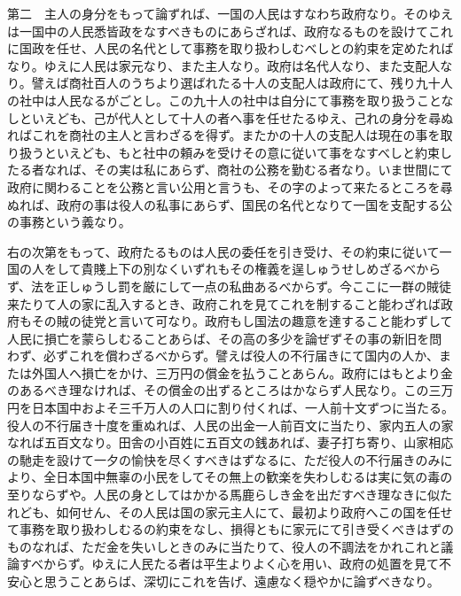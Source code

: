 \documentclass[a4paper, platex, dvipdfmx]{jsarticle}
\begin{document}
第二　主人の身分をもって論ずれば、一国の人民はすなわち政府なり。そのゆえは一国中の人民悉皆政をなすべきものにあらざれば、政府なるものを設けてこれに国政を任せ、人民の名代として事務を取り扱わしむべしとの約束を定めたればなり。ゆえに人民は家元なり、また主人なり。政府は名代人なり、また支配人なり。譬えば商社百人のうちより選ばれたる十人の支配人は政府にて、残り九十人の社中は人民なるがごとし。この九十人の社中は自分にて事務を取り扱うことなしといえども、己が代人として十人の者へ事を任せたるゆえ、己れの身分を尋ぬればこれを商社の主人と言わざるを得ず。またかの十人の支配人は現在の事を取り扱うといえども、もと社中の頼みを受けその意に従いて事をなすべしと約束したる者なれば、その実は私にあらず、商社の公務を勤むる者なり。いま世間にて政府に関わることを公務と言い公用と言うも、その字のよって来たるところを尋ぬれば、政府の事は役人の私事にあらず、国民の名代となりて一国を支配する公の事務という義なり。

右の次第をもって、政府たるものは人民の委任を引き受け、その約束に従いて一国の人をして貴賤上下の別なくいずれもその権義を逞しゅうせしめざるべからず、法を正しゅうし罰を厳にして一点の私曲あるべからず。今ここに一群の賊徒来たりて人の家に乱入するとき、政府これを見てこれを制すること能わざれば政府もその賊の徒党と言いて可なり。政府もし国法の趣意を達すること能わずして人民に損亡を蒙らしむることあらば、その高の多少を論ぜずその事の新旧を問わず、必ずこれを償わざるべからず。譬えば役人の不行届きにて国内の人か、または外国人へ損亡をかけ、三万円の償金を払うことあらん。政府にはもとより金のあるべき理なければ、その償金の出ずるところはかならず人民なり。この三万円を日本国中およそ三千万人の人口に割り付くれば、一人前十文ずつに当たる。役人の不行届き十度を重ぬれば、人民の出金一人前百文に当たり、家内五人の家なれば五百文なり。田舎の小百姓に五百文の銭あれば、妻子打ち寄り、山家相応の馳走を設けて一夕の愉快を尽くすべきはずなるに、ただ役人の不行届きのみにより、全日本国中無辜の小民をしてその無上の歓楽を失わしむるは実に気の毒の至りならずや。人民の身としてはかかる馬鹿らしき金を出だすべき理なきに似たれども、如何せん、その人民は国の家元主人にて、最初より政府へこの国を任せて事務を取り扱わしむるの約束をなし、損得ともに家元にて引き受くべきはずのものなれば、ただ金を失いしときのみに当たりて、役人の不調法をかれこれと議論すべからず。ゆえに人民たる者は平生よりよく心を用い、政府の処置を見て不安心と思うことあらば、深切にこれを告げ、遠慮なく穏やかに論ずべきなり。
\end{document}
